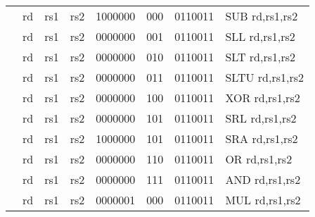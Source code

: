 \begin{table}[p]
\begin{small}
\begin{center}
\begin{tabular}{rccccccccccl}
&
\multicolumn{1}{|c|}{rd} &
\multicolumn{1}{c|}{rs1} &
\multicolumn{1}{c|}{rs2} &
\multicolumn{4}{c|}{1000000} &
\multicolumn{2}{c|}{000} &
\multicolumn{1}{c|}{0110011} & SUB rd,rs1,rs2 \\
\cline{2-11}
  

&
\multicolumn{1}{|c|}{rd} &
\multicolumn{1}{c|}{rs1} &
\multicolumn{1}{c|}{rs2} &
\multicolumn{4}{c|}{0000000} &
\multicolumn{2}{c|}{001} &
\multicolumn{1}{c|}{0110011} & SLL rd,rs1,rs2 \\
\cline{2-11}
  

&
\multicolumn{1}{|c|}{rd} &
\multicolumn{1}{c|}{rs1} &
\multicolumn{1}{c|}{rs2} &
\multicolumn{4}{c|}{0000000} &
\multicolumn{2}{c|}{010} &
\multicolumn{1}{c|}{0110011} & SLT rd,rs1,rs2 \\
\cline{2-11}
  

&
\multicolumn{1}{|c|}{rd} &
\multicolumn{1}{c|}{rs1} &
\multicolumn{1}{c|}{rs2} &
\multicolumn{4}{c|}{0000000} &
\multicolumn{2}{c|}{011} &
\multicolumn{1}{c|}{0110011} & SLTU rd,rs1,rs2 \\
\cline{2-11}
  

&
\multicolumn{1}{|c|}{rd} &
\multicolumn{1}{c|}{rs1} &
\multicolumn{1}{c|}{rs2} &
\multicolumn{4}{c|}{0000000} &
\multicolumn{2}{c|}{100} &
\multicolumn{1}{c|}{0110011} & XOR rd,rs1,rs2 \\
\cline{2-11}
  

&
\multicolumn{1}{|c|}{rd} &
\multicolumn{1}{c|}{rs1} &
\multicolumn{1}{c|}{rs2} &
\multicolumn{4}{c|}{0000000} &
\multicolumn{2}{c|}{101} &
\multicolumn{1}{c|}{0110011} & SRL rd,rs1,rs2 \\
\cline{2-11}
  

&
\multicolumn{1}{|c|}{rd} &
\multicolumn{1}{c|}{rs1} &
\multicolumn{1}{c|}{rs2} &
\multicolumn{4}{c|}{1000000} &
\multicolumn{2}{c|}{101} &
\multicolumn{1}{c|}{0110011} & SRA rd,rs1,rs2 \\
\cline{2-11}
  

&
\multicolumn{1}{|c|}{rd} &
\multicolumn{1}{c|}{rs1} &
\multicolumn{1}{c|}{rs2} &
\multicolumn{4}{c|}{0000000} &
\multicolumn{2}{c|}{110} &
\multicolumn{1}{c|}{0110011} & OR rd,rs1,rs2 \\
\cline{2-11}
  

&
\multicolumn{1}{|c|}{rd} &
\multicolumn{1}{c|}{rs1} &
\multicolumn{1}{c|}{rs2} &
\multicolumn{4}{c|}{0000000} &
\multicolumn{2}{c|}{111} &
\multicolumn{1}{c|}{0110011} & AND rd,rs1,rs2 \\
\cline{2-11}
  

&
\multicolumn{1}{|c|}{rd} &
\multicolumn{1}{c|}{rs1} &
\multicolumn{1}{c|}{rs2} &
\multicolumn{4}{c|}{0000001} &
\multicolumn{2}{c|}{000} &
\multicolumn{1}{c|}{0110011} & MUL rd,rs1,rs2 \\
\cline{2-11}
  


\end{tabular}
\end{center}
\end{small}
\end{table}
